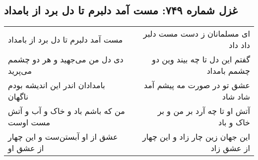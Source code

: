 \begin{center}
\section*{غزل شماره ۷۴۹: مست آمد دلبرم تا دل برد از بامداد}
\label{sec:0749}
\begin{longtable}{l p{0.5cm} r}
مست آمد دلبرم تا دل برد از بامداد
&&
ای مسلمانان ز دست مست دلبر داد داد
\\
دی دل من می‌جهید و هر دو چشمم می‌پرید
&&
گفتم این دل تا چه بیند وین دو چشمم بامداد
\\
بامدادان اندر این اندیشه بودم ناگهان
&&
عشق تو در صورت مه پیشم آمد شاد شاد
\\
من که باشم باد و خاک و آب و آتش مست اوست
&&
آتش او تا چه آرد بر من و بر خاک و باد
\\
عشق از او آبستن‌ست و این چهار از عشق او
&&
این جهان زین چار زاد و این چهار از عشق زاد
\\
\end{longtable}
\end{center}
